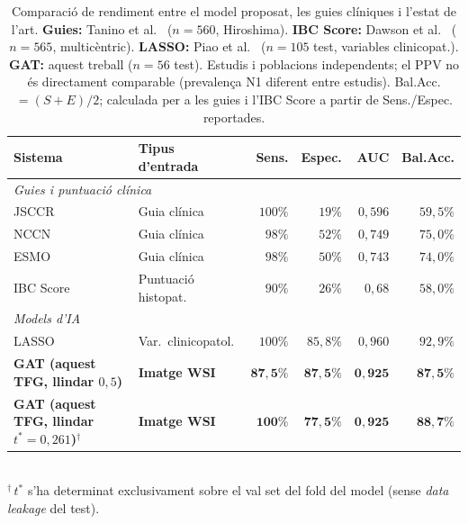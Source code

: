 \documentclass[10pt,a4paper,twocolumn,twoside]{article}
\begin{document}
\begin{table}[h]
\centering
\caption{Comparació de rendiment entre el model proposat, les guies clíniques i l'estat
de l'art. \textbf{Guies:} Tanino et al.~\cite{tanino2024comparative} ($n\!=\!560$, Hiroshima).
\textbf{IBC Score:} Dawson et al.~\cite{dawson2024budding} ($n\!=\!565$, multicèntric).
\textbf{LASSO:} Piao et al.~\cite{piao2023ai} ($n\!=\!105$ test, variables clinicopat.).
\textbf{GAT:} aquest treball ($n\!=\!56$ test).
Estudis i poblacions independents; el PPV no és directament comparable
(prevalença N1 diferent entre estudis).
Bal.Acc. $= (S\!+\!E)/2$; calculada per a les guies i l'IBC Score a partir de Sens./Espec.
reportades.} %
\label{tab:comparison}
\small
\begin{tabular}{llrrrr}
\toprule
\textbf{Sistema} & \textbf{Tipus d'entrada} & \textbf{Sens.} & \textbf{Espec.} & \textbf{AUC} & \textbf{Bal.Acc.} \\
\midrule
\multicolumn{6}{l}{\textit{Guies i puntuació clínica}} \\[2pt]
JSCCR \cite{jsccr2019}        & Guia clínica  & $100\%$ & $19\%$  & $0{,}596$ & $59{,}5\%$ \\
NCCN                           & Guia clínica  & $98\%$  & $52\%$  & $0{,}749$ & $75{,}0\%$ \\
ESMO \cite{esge2022}           & Guia clínica  & $98\%$  & $50\%$  & $0{,}743$ & $74{,}0\%$ \\
IBC Score \cite{dawson2024budding} & Puntuació histopat. & $90\%$ & $26\%$ & $0{,}68$ & $58{,}0\%$ \\
\midrule
\multicolumn{6}{l}{\textit{Models d'IA}} \\[2pt]
LASSO \cite{piao2023ai}                             & Var.\ clinicopatol. & $100\%$  & $85{,}8\%$ & $0{,}960$ & $92{,}9\%$ \\
\textbf{GAT (aquest TFG, llindar $0{,}5$)}          & \textbf{Imatge WSI} & $\mathbf{87{,}5\%}$  & $\mathbf{87{,}5\%}$  & $\mathbf{0{,}925}$ & $\mathbf{87{,}5\%}$ \\
\textbf{GAT (aquest TFG, llindar $t^*\!=\!0{,}261$)$^{\dagger}$} & \textbf{Imatge WSI} & $\mathbf{100\%}$ & $\mathbf{77{,}5\%}$ & $\mathbf{0{,}925}$ & $\mathbf{88{,}7\%}$ \\
\bottomrule
\end{tabular}\\[2pt]
\footnotesize{$^{\dagger}$\,$t^*$ s'ha determinat exclusivament sobre el val set del fold del model
(sense \textit{data leakage} del test).}
\end{table}
\end{document}
